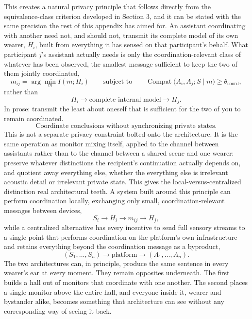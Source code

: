 \documentclass[12pt]{article}
\begin{document}
This creates a natural privacy principle that follows directly from the equivalence-class criterion developed in Section 3, and it can be stated with the same precision the rest of this appendix has aimed for. An assistant coordinating with another need not, and should not, transmit its complete model of its own wearer, $H_i$, built from everything it has sensed on that participant's behalf. What participant $j$'s assistant actually needs is only the coordination-relevant class of whatever has been observed, the smallest message sufficient to keep the two of them jointly coordinated,
\[
m_{ij} = \arg\min_m I(m; H_i) \qquad \text{subject to} \qquad \operatorname{Compat}\bigl(A_i, A_j; S \mid m\bigr) \geq \theta_{\mathrm{coord}},
\]
rather than
\[
H_i \rightarrow \text{complete internal model} \rightarrow H_j.
\]
In prose: transmit the least about oneself that is sufficient for the two of you to remain coordinated.
\[
\boxed{\text{Coordinate conclusions without synchronizing private states.}}
\]
This is not a separate privacy constraint bolted onto the architecture. It is the same operation as monitor mixing itself, applied to the channel between assistants rather than to the channel between a shared scene and one wearer: preserve whatever distinctions the recipient's continuation actually depends on, and quotient away everything else, whether the everything else is irrelevant acoustic detail or irrelevant private state. This gives the local-versus-centralized distinction real architectural teeth. A system built around this principle can perform coordination locally, exchanging only small, coordination-relevant messages between devices,
\[
S_i \rightarrow H_i \rightarrow m_{ij} \rightarrow H_j,
\]
while a centralized alternative has every incentive to send full sensory streams to a single point that performs coordination on the platform's own infrastructure and retains everything beyond the coordination message as a byproduct,
\[
(S_1, \ldots, S_n) \rightarrow \text{platform} \rightarrow (A_1, \ldots, A_n).
\]
The two architectures can, in principle, produce the same sentence in every wearer's ear at every moment. They remain opposites underneath. The first builds a hall out of monitors that coordinate with one another. The second places a single monitor above the entire hall, and everyone inside it, wearer and bystander alike, becomes something that architecture can see without any corresponding way of seeing it back.
\end{document}
